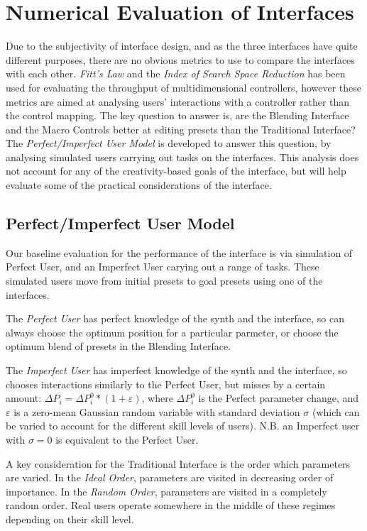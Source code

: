 \documentclass[11pt, oneside]{report}   	%
\begin{document}
\chapter{Numerical Evaluation of Interfaces}
Due to the subjectivity of interface design, and as the three interfaces have quite different purposes, there are no obvious metrics to use to compare the interfaces with each other. 
\emph{Fitt's Law} and the \emph{Index of Search Space Reduction} \cite{TubbThesis} has been used for evaluating the throughput of multidimensional controllers, however these metrics are aimed at analysing users' interactions with a controller rather than the control mapping. 
The key question to answer is, are the Blending Interface and the Macro Controls better at editing presets than the Traditional Interface?
The \emph{Perfect/Imperfect User Model}  is developed to answer this question, by analysing simulated users carrying out tasks on the interfaces. This analysis does not account for any of the creativity-based goals of the interface, but will help evaluate some of the practical considerations of the interface. 
\section{Perfect/Imperfect User Model}\label{sec:PerfectImperfect}
Our baseline evaluation for the performance of the interface is via simulation of Perfect User, and an Imperfect User carying out a range of tasks. These simulated users move from initial presets to goal presets using one of the interfaces. 
 
The \emph{Perfect User} has perfect knowledge of the synth and the interface, so can always choose the optimum position for a particular parmeter, or choose the optimum blend of presets in the Blending Interface.

The \emph{Imperfect User} has imperfect knowledge of the synth and the interface, so chooses interactions similarly to the Perfect User, but misses by a certain amount: $\Delta P_i = \Delta P_i^0 * (1 + \varepsilon)$, where $\Delta P_i^0$ is the Perfect parameter change, and $\varepsilon$ is a zero-mean Gaussian random variable with standard deviation $\sigma$ (which can be varied to account for the different skill levels of users). N.B. an Imperfect user with $\sigma = 0$ is equivalent to the Perfect User.

A key consideration for the Traditional Interface is the order which parameters are varied. In the \emph{Ideal Order}, parameters are visited in decreasing order of importance. In the \emph{Random Order}, parameters are visited in a completely random order. Real users operate somewhere in the middle of these regimes depending on their skill level. 
\vspace{-10pt}
\end{document}

